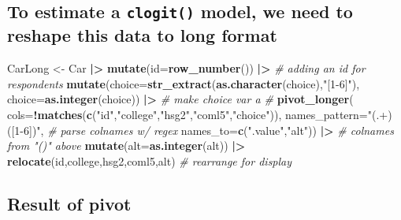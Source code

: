\documentclass[
  11pt,
]{article}
\newenvironment{Shaded}{\begin{snugshade}}{\end{snugshade}}
\newcommand{\AttributeTok}[1]{\textcolor[rgb]{0.13,0.29,0.53}{#1}}
\newcommand{\CommentTok}[1]{\textcolor[rgb]{0.56,0.35,0.01}{\textit{#1}}}
\newcommand{\FunctionTok}[1]{\textcolor[rgb]{0.13,0.29,0.53}{\textbf{#1}}}
\newcommand{\NormalTok}[1]{#1}
\newcommand{\OtherTok}[1]{\textcolor[rgb]{0.56,0.35,0.01}{#1}}
\newcommand{\SpecialCharTok}[1]{\textcolor[rgb]{0.81,0.36,0.00}{\textbf{#1}}}
\newcommand{\StringTok}[1]{\textcolor[rgb]{0.31,0.60,0.02}{#1}}
\begin{document}
\normalsize

\hypertarget{to-estimate-a-clogit-model-we-need-to-reshape-this-data-to-long-format}{%
\subsection{\texorpdfstring{To estimate a \texttt{clogit()} model, we
need to reshape this data to long
format}{To estimate a clogit() model, we need to reshape this data to long format}}\label{to-estimate-a-clogit-model-we-need-to-reshape-this-data-to-long-format}}

\footnotesize

\begin{Shaded}
\begin{Highlighting}[]
\NormalTok{CarLong }\OtherTok{\textless{}{-}}\NormalTok{ Car }\SpecialCharTok{|\textgreater{}} 
  \FunctionTok{mutate}\NormalTok{(}\AttributeTok{id=}\FunctionTok{row\_number}\NormalTok{()) }\SpecialCharTok{|\textgreater{}} \CommentTok{\# adding an id for respondents}
  \FunctionTok{mutate}\NormalTok{(}\AttributeTok{choice=}\FunctionTok{str\_extract}\NormalTok{(}\FunctionTok{as.character}\NormalTok{(choice),}\StringTok{"[1{-}6]"}\NormalTok{),}
    \AttributeTok{choice=}\FunctionTok{as.integer}\NormalTok{(choice)) }\SpecialCharTok{|\textgreater{}} \CommentTok{\# make choice var a \#}
  \FunctionTok{pivot\_longer}\NormalTok{(}
    \AttributeTok{cols=}\SpecialCharTok{!}\FunctionTok{matches}\NormalTok{(}\FunctionTok{c}\NormalTok{(}\StringTok{"id"}\NormalTok{,}\StringTok{"college"}\NormalTok{,}\StringTok{"hsg2"}\NormalTok{,}\StringTok{"coml5"}\NormalTok{,}\StringTok{"choice"}\NormalTok{)),}
    \AttributeTok{names\_pattern=}\StringTok{"(.+)([1{-}6])"}\NormalTok{,  }\CommentTok{\# parse colnames w/ regex}
    \AttributeTok{names\_to=}\FunctionTok{c}\NormalTok{(}\StringTok{".value"}\NormalTok{,}\StringTok{"alt"}\NormalTok{)) }\SpecialCharTok{|\textgreater{}} \CommentTok{\# colnames from "()" above}
  \FunctionTok{mutate}\NormalTok{(}\AttributeTok{alt=}\FunctionTok{as.integer}\NormalTok{(alt)) }\SpecialCharTok{|\textgreater{}} 
  \FunctionTok{relocate}\NormalTok{(id,college,hsg2,coml5,alt) }\CommentTok{\# rearrange for display}
\end{Highlighting}
\end{Shaded}

\normalsize

\hypertarget{result-of-pivot}{%
\subsection{Result of pivot}\label{result-of-pivot}}
\end{document}

